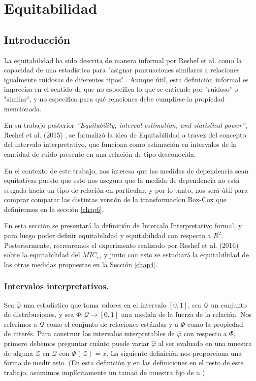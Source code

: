 \chapter{Equitabilidad}\label{appC}

	\section{Introducci\'on}

	La equitabilidad ha sido descrita de manera informal por Reshef et al. como la capacidad de una estad\'istica para "asignar puntuaciones similares a relaciones igualmente ruidosas de diferentes tipos" \cite{Reshef2011}. Aunque \'util, esta definici\'on informal es imprecisa en el sentido de que no especifica lo que se entiende por "ruidoso" o "similar", y no especifica para qu\'e relaciones debe cumplirse la propiedad mencionada.

	En su trabajo posterior \textit{''Equitability, interval estimation, and statistical power''}, Reshef et al. (2015) \cite{Reshef2015}, se formaliz\'o la idea de Equitabilidad a travez del concepto del intervalo interpretativo, que funciona como estimaci\'on en intervalos de la cantidad de ruido presente en una relaci\'on de tipo desconocida. 

	En el contexto de este trabajo, nos interesa que las medidas de dependencia sean equitativas puesto que esto nos asegura que la medida de dependencia no est\'a sesgada hacia un tipo de relaci\'on en particular, y por lo tanto, nos ser\'a \'util para comprar comparar las distintas versi\'on de la transformac\'ion Box-Cox que definiremos en la secci\'on \ref{chap6}.

	En esta secci\'on se presentar\'a la definici\'on de Intercalo Interpretativo formal, y para luego poder definir equitabilidad y  equitabilidad con respecto a $R^2$. Posteriormente, recrearemos el experimento realizado por Reshef et al. (2016) \cite{Reshef2016} sobre la equitabilidad del $MIC_e$, y junto con esto se estudiar\'a la equitabilidad de las otras medidas propuestas en la Secci\'on \ref{chap4}. 

	\subsection[equidefiniciones]{Intervalos interpretativos.}

	Sea $\hat{\varphi}$ una estad\'istico que toma valores en el intervalo $[0,1]$, sea $\mathcal{Q}$ un conjunto de distribuciones, y sea $\Phi: \mathcal{Q} \rightarrow [0,1]$ una medida de la fuerza de la relaci\'on. Nos referimos a $\mathcal{Q}$ como el conjunto de relaciones est\'andar y a $\Phi$ como la propiedad de inter\'es. Para construir los intervalos interpretables de $\hat{\varphi}$ con respecto a $\Phi$, primero debemos preguntar cu\'anto puede variar $\hat{\varphi}$ al ser evaluado en una muestra de alguna $\mathcal{Z}$ en $\mathcal{Q}$ con $\Phi(\mathcal{Z})=x$. La siguiente definici\'on nos proporciona una forma de medir esto. (En esta definici\'on y en las definiciones en el resto de este trabajo, asumimos impl\'icitamente un tama\~o de muestra fijo de $n$.)


